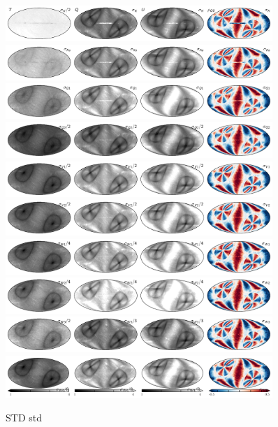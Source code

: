 \documentclass[twocolumn]{../../common/aa}
\begin{document}
\begin{figure}[p]
	\centering
	\includegraphics[width=0.9\textwidth]{figures/023-WMAP_K_std.pdf}
	\includegraphics[width=0.9\textwidth]{figures/030-WMAP_Ka_std.pdf}
	\includegraphics[width=0.9\textwidth]{figures/040-WMAP_Q1_std.pdf}
	\includegraphics[width=0.9\textwidth]{figures/040-WMAP_Q2_std.pdf}
	\includegraphics[width=0.9\textwidth]{figures/060-WMAP_V1_std.pdf}
	\includegraphics[width=0.9\textwidth]{figures/060-WMAP_V2_std.pdf}
	\includegraphics[width=0.9\textwidth]{figures/090-WMAP_W1_std.pdf}
	\includegraphics[width=0.9\textwidth]{figures/090-WMAP_W2_std.pdf}
	\includegraphics[width=0.9\textwidth]{figures/090-WMAP_W3_std.pdf}
	\includegraphics[width=0.9\textwidth]{figures/090-WMAP_W4_std.pdf}
	\caption{STD std}
        \label{fig:std}
\end{figure}
\end{document}
